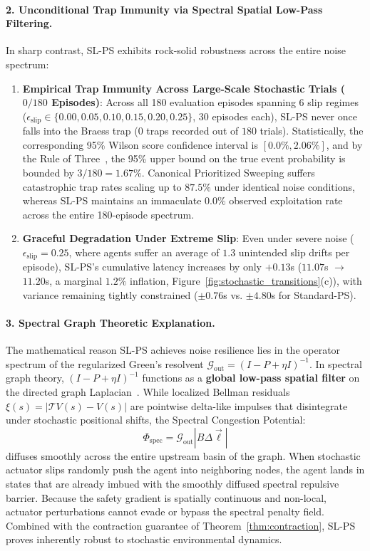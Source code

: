 \documentclass[11pt,a4paper]{article}
\begin{document}
\paragraph{2. Unconditional Trap Immunity via Spectral Spatial Low-Pass Filtering.}
In sharp contrast, SL-PS exhibits rock-solid robustness across the entire noise spectrum:
\begin{enumerate}
    \item \textbf{Empirical Trap Immunity Across Large-Scale Stochastic Trials ($0/180$ Episodes)}: Across all 180 evaluation episodes spanning 6 slip regimes ($\epsilon_{\text{slip}} \in \{0.00, 0.05, 0.10, 0.15, 0.20, 0.25\}$, 30 episodes each), SL-PS never once falls into the Braess trap ($0$ traps recorded out of $180$ trials). Statistically, the corresponding 95\% Wilson score confidence interval is $[0.0\%, 2.06\%]$, and by the Rule of Three~\cite{jovanovic1997rule}, the 95\% upper bound on the true event probability is bounded by $3/180 = 1.67\%$. Canonical Prioritized Sweeping suffers catastrophic trap rates scaling up to $87.5\%$ under identical noise conditions, whereas SL-PS maintains an immaculate $\mathbf{0.0\%}$ observed exploitation rate across the entire 180-episode spectrum.
    \item \textbf{Graceful Degradation Under Extreme Slip}: Even under severe noise ($\epsilon_{\text{slip}} = 0.25$, where agents suffer an average of $1.3$ unintended slip drifts per episode), SL-PS's cumulative latency increases by only $\mathbf{+0.13}$s ($11.07$s $\to$ $11.20$s, a marginal $1.2\%$ inflation, Figure~\ref{fig:stochastic_transitions}(c)), with variance remaining tightly constrained ($\pm 0.76$s vs. $\pm 4.80$s for Standard-PS).
\end{enumerate}

\paragraph{3. Spectral Graph Theoretic Explanation.}
The mathematical reason SL-PS achieves noise resilience lies in the operator spectrum of the regularized Green's resolvent $\mathcal{G}_{\text{out}} = (I - P + \eta I)^{-1}$. In spectral graph theory, $(I - P + \eta I)^{-1}$ functions as a \textbf{global low-pass spatial filter} on the directed graph Laplacian~\cite{mahadevan2007proto,spielman2025sagt}. While localized Bellman residuals $\xi(s) = |\mathcal{T} V(s) - V(s)|$ are pointwise delta-like impulses that disintegrate under stochastic positional shifts, the Spectral Congestion Potential:
\begin{equation}
\Phi_{\text{spec}} = \mathcal{G}_{\text{out}} |B \Delta \vec{\ell}|
\end{equation}
diffuses smoothly across the entire upstream basin of the graph. When stochastic actuator slips randomly push the agent into neighboring nodes, the agent lands in states that are already imbued with the smoothly diffused spectral repulsive barrier. Because the safety gradient is spatially continuous and non-local, actuator perturbations cannot evade or bypass the spectral penalty field. Combined with the contraction guarantee of Theorem~\ref{thm:contraction}, SL-PS proves inherently robust to stochastic environmental dynamics.
\end{document}

